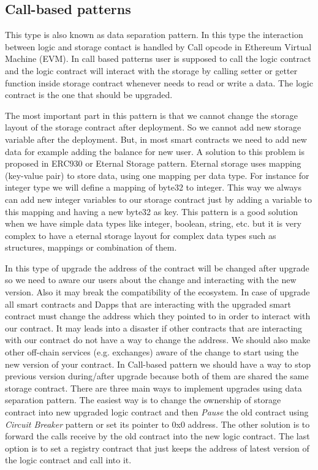 
\subsection{Call-based patterns}

This type is also known as data separation pattern. In this type the interaction between logic and storage contact is handled by Call opcode in Ethereum Virtual Machine (EVM). In call based patterns user is supposed to call the logic contract and the logic contract will interact with the storage by calling setter or getter function inside storage contract whenever needs to read or write a data. The logic contract is the one that should be upgraded.

The most important part in this pattern is that we cannot change the storage layout of the storage contract after deployment. So we cannot add new storage variable after the deployment. But, in most smart contracts we need to add new data for example adding the balance for new user. A solution to this problem is proposed in ERC930 or Eternal Storage pattern. Eternal storage uses mapping (key-value pair) to store data, using one mapping per data type. For instance for integer type we will define a mapping of byte32 to integer. This way we always can add new integer variables to our storage contract just by adding a variable to this mapping and having a new byte32 as key. This pattern is a good solution when we have simple data types like integer, boolean, string, etc. but it is very complex to have a eternal storage layout for complex data types such as structures, mappings or combination of them.

In this type of upgrade the address of the contract will be changed after upgrade so we need to aware our users about the change and interacting with the new version. Also it may break the compatibility of the ecosystem. In case of upgrade all smart contracts and Dapps that are interacting with the upgraded smart contract must change the address which they pointed to in order to interact with our contract. It may leads into a disaster if other contracts that are interacting with our contract do not have a way to change the address. We should also make other off-chain services (e.g. exchanges) aware of the change to start using the new version of your contract. In Call-based pattern we should have a way to stop previous version during/after upgrade because both of them are shared the same storage contract. 
There are three main ways to implement upgrades using data separation pattern. The easiest way is to change the ownership of storage contract into new upgraded logic contract and then \textit{Pause} the old contract using \textit{Circuit Breaker} pattern or set its pointer to 0x0 address. The other solution is to forward the calls receive by the old contract into the new logic contract. The last option is to set a registry contract that just keeps the address of latest version of the logic contract and call into it.


